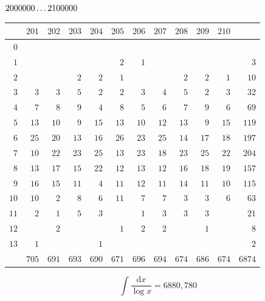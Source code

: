 \clearpage
\noindent\begin{minipage}{\linewidth}\centering
{}
\(2000000\mathinner{.\,.\,.}2100000\)\par\smallskip
\begingroup\fontsize{10.5}{11.5}\selectfont\setlength{\tabcolsep}{3.5pt}\renewcommand{\arraystretch}{1}
\begin{tabular}{r|rrrrrrrrrr|r}\hline
 & $201$ & $202$ & $203$ & $204$ & $205$ & $206$ & $207$ & $208$ & $209$ & $210$ &  \\ \hline
$0$ &  &  &  &  &  &  &  &  &  &  &  \\
$1$ &  &  &  &  & $2$ & $1$ &  &  &  &  & $3$ \\
$2$ &  &  & $2$ & $2$ & $1$ &  &  & $2$ & $2$ & $1$ & $10$ \\
$3$ & $3$ & $3$ & $5$ & $2$ & $2$ & $3$ & $4$ & $5$ & $2$ & $3$ & $32$ \\
$4$ & $7$ & $8$ & $9$ & $4$ & $8$ & $5$ & $6$ & $7$ & $9$ & $6$ & $69$ \\
$5$ & $13$ & $10$ & $9$ & $15$ & $13$ & $10$ & $12$ & $13$ & $9$ & $15$ & $119$ \\
$6$ & $25$ & $20$ & $13$ & $16$ & $26$ & $23$ & $25$ & $14$ & $17$ & $18$ & $197$ \\
$7$ & $10$ & $22$ & $23$ & $25$ & $13$ & $23$ & $18$ & $23$ & $25$ & $22$ & $204$ \\
$8$ & $13$ & $17$ & $15$ & $22$ & $12$ & $13$ & $12$ & $16$ & $18$ & $19$ & $157$ \\
$9$ & $16$ & $15$ & $11$ & $4$ & $11$ & $12$ & $11$ & $14$ & $11$ & $10$ & $115$ \\
$10$ & $10$ & $2$ & $8$ & $6$ & $11$ & $7$ & $7$ & $3$ & $3$ & $6$ & $63$ \\
$11$ & $2$ & $1$ & $5$ & $3$ &  & $1$ & $3$ & $3$ & $3$ &  & $21$ \\
$12$ &  & $2$ &  &  & $1$ & $2$ & $2$ &  & $1$ &  & $8$ \\
$13$ & $1$ &  &  & $1$ &  &  &  &  &  &  & $2$ \\
\hline
 & $705$ & $691$ & $693$ & $690$ & $671$ & $696$ & $694$ & $674$ & $686$ & $674$ & $6874$ \\ \hline
\end{tabular}\par\endgroup
\setlength{\abovedisplayskip}{6pt}\setlength{\belowdisplayskip}{4pt}
\[\int\frac{\mathrm{d}x}{\log x}=6880{,}780\]
\end{minipage}

